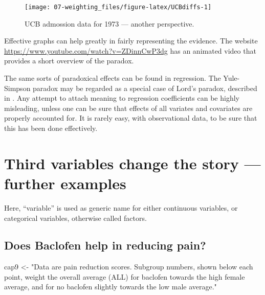 \documentclass[
  10pt,
  b5paper]{book}
\newenvironment{Shaded}{\begin{snugshade}}{\end{snugshade}}
\newcommand{\NormalTok}[1]{#1}
\newcommand{\OtherTok}[1]{\textcolor[rgb]{0.56,0.35,0.01}{#1}}
\newcommand{\StringTok}[1]{\textcolor[rgb]{0.31,0.60,0.02}{#1}}
\begin{document}
\begin{figure}[H]
\texttt{[image: 07-weighting\_files/figure-latex/UCBdiffs-1]} \caption{UCB admossion data for 1973 --- another perspective.}\label{fig:UCBdiffs}
\end{figure}

Effective graphs can help greatly in fairly representing the evidence.
The website
\url{https://www.youtube.com/watch?v=ZDinnCwP3dg}
has an animated video that provides a short overview of the paradox.

The same sorts of paradoxical effects can be found in regression.
The Yule-Simpson paradox may be regarded as a special case of Lord's
paradox, described in \citet{lord1967paradox}. Any attempt to attach meaning
to regression coefficients can be highly misleading, unless one can be
sure that effects of all variates and covariates are properly
accounted for. It is rarely easy, with observational data, to be sure
that this has been done effectively.

\hypertarget{third-variables-change-the-story-further-examples}{%
\section{Third variables change the story --- further examples}\label{third-variables-change-the-story-further-examples}}

Here, ``variable'' is used as generic name for either continuous
variables, or categorical variables, otherwise called factors.

\hypertarget{does-baclofen-help-in-reducing-pain}{%
\subsection*{Does Baclofen help in reducing pain?}\label{does-baclofen-help-in-reducing-pain}}

\begin{Shaded}
\begin{Highlighting}[]
\NormalTok{cap9 }\OtherTok{\textless{}{-}} \StringTok{"Data are pain reduction scores. Subgroup numbers, shown}
\StringTok{    below each point, weight the overall average (\textquotesingle{}\textquotesingle{}ALL\textquotesingle{}\textquotesingle{}) for}
\StringTok{    baclofen towards the high female average, and for no baclofen}
\StringTok{    slightly towards the low male average."}
\end{Highlighting}
\end{Shaded}
\end{document}
